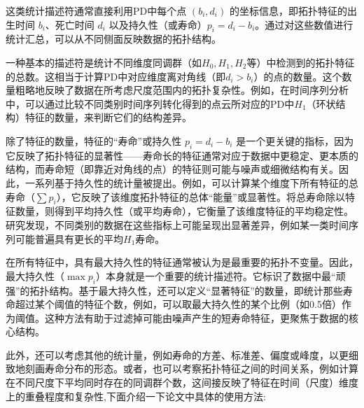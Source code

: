 这类统计描述符通常直接利用PD中每个点 $(b_i, d_i)$ 的坐标信息，即拓扑特征的出生时间 $b_i$、死亡时间 $d_i$ 以及持久性（或寿命）$p_i = d_i - b_i$。通过对这些数值进行统计汇总，可以从不同侧面反映数据的拓扑结构。

一种基本的描述符是统计不同维度同调群（如$H_0, H_1, H_2$等）中检测到的拓扑特征的总数。这相当于计算PD中对应维度离对角线（即$d_i > b_i$）的点的数量。这个数量粗略地反映了数据在所考虑尺度范围内的拓扑复杂性。例如，在时间序列分析中，可以通过比较不同类别时间序列转化得到的点云所对应的PD中$H_1$（环状结构）特征的数量，来判断它们的结构差异。

除了特征的数量，特征的“寿命”或持久性 $p_i = d_i - b_i$ 是一个更关键的指标，因为它反映了拓扑特征的显著性——寿命长的特征通常对应于数据中更稳定、更本质的结构，而寿命短（即靠近对角线的点）的特征则可能与噪声或细微结构有关。因此，一系列基于持久性的统计量被提出。例如，可以计算某个维度下所有特征的总寿命（$\sum p_i$），它反映了该维度拓扑特征的总体“能量”或显著性。将总寿命除以特征数量，则得到平均持久性（或平均寿命），它衡量了该维度特征的平均稳定性。研究发现，不同类别的数据在这些指标上可能呈现出显著差异，例如某一类时间序列可能普遍具有更长的平均$H_1$寿命。

在所有特征中，具有最大持久性的特征通常被认为是最重要的拓扑不变量。因此，最大持久性（$\max p_i$）本身就是一个重要的统计描述符。它标识了数据中最“顽强”的拓扑结构。基于最大持久性，还可以定义“显著特征”的数量，即统计那些寿命超过某个阈值的特征个数，例如，可以取最大持久性的某个比例（如0.5倍）作为阈值。这种方法有助于过滤掉可能由噪声产生的短寿命特征，更聚焦于数据的核心结构。



此外，还可以考虑其他的统计量，例如寿命的方差、标准差、偏度或峰度，以更细致地刻画寿命分布的形态。或者，也可以考察拓扑特征之间的时间关系，例如计算在不同尺度下平均同时存在的同调群个数，这间接反映了特征在时间（尺度）维度上的重叠程度和复杂性,下面介绍一下论文中具体的使用方法:

